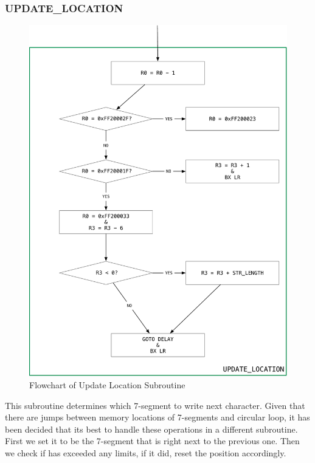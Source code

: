 \documentclass[titlepage]{article}
\begin{document}
	\subsubsection{UPDATE\_LOCATION}
	\begin{figure}
		\centering
		\includegraphics[scale=.2]{../images/update_location.pdf}
		\caption{Flowchart of Update Location Subroutine}
	\end{figure}
	This subroutine determines which 7-segment to write next character. Given that there are jumps between memory locations of 7-segments and circular loop, it has been decided that its best to handle these operations in a different subroutine. First we set it to be the 7-segment that is right next to the previous one. Then we check if has exceeded any limits, if it did, reset the position accordingly.
\end{document}
